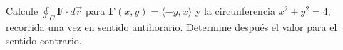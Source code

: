 Calcule $\oint_C\mathbf{F}\cdot d\vec r$ para $\mathbf{F}(x,y)=\langle-y,x\rangle$ y la circunferencia $x^2+y^2=4$, recorrida una vez en sentido antihorario. Determine después el valor para el sentido contrario.
